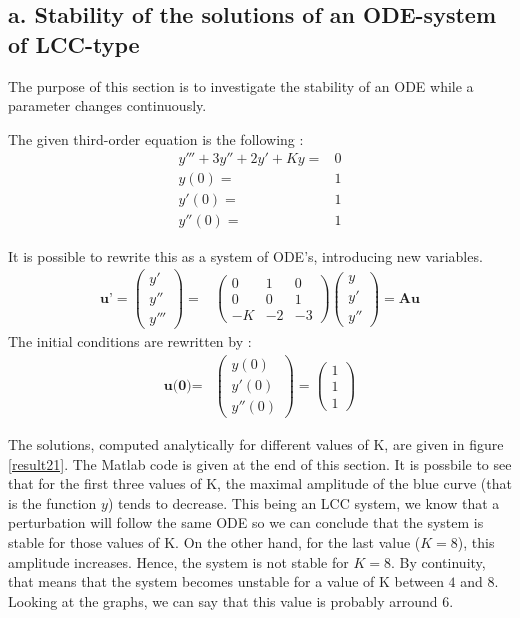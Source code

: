 \subsection*{a. Stability of the solutions of an ODE-system of LCC-type}
The purpose of this section is to investigate the stability of an ODE while a parameter changes continuously.

The given third-order equation is the following : 
\begin{eqnarray*}
y'''+3y''+2y'+Ky =& 0 \\
y(0) =& 1\\
y'(0)=&1\\
y''(0)=&1
\end{eqnarray*}

It is possible to rewrite this as a system of ODE's, introducing new variables.
\begin{eqnarray*}
\textbf{u'}  = \left( \begin{array}{c}
y' \\ 
y'' \\ 
y'''
\end{array} \right) =& \left( \begin{array}{ccc}
0 & 1 & 0 \\ 
0 & 0 & 1 \\ 
-K & -2 & -3
\end{array}  \right) \left( \begin{array}{c}
y \\ 
y'\\ 
y''
\end{array} \right) = \textbf{Au} 
\end{eqnarray*}
The initial conditions are rewritten by :
\begin{eqnarray*}
\textbf{u(0)} =& \left( \begin{array}{c}
y(0) \\ 
y'(0)\\ 
y''(0)
\end{array} \right) = \left( \begin{array}{c}
1\\ 
1\\ 
1
\end{array} \right) 
\end{eqnarray*}

The solutions, computed analytically for different values of K, are given in figure \ref{result21}. The Matlab code is given at the end of this section. It is possbile to see that for the first three values of K, the maximal amplitude of the blue curve (that is the function $y$) tends to decrease. This being an LCC system, we know that a perturbation will follow the same ODE so we can conclude that the system is stable for those values of K. On the other hand, for the last value ($K=8$), this amplitude increases. Hence, the system is not stable for $K=8$. By continuity, that means that the system becomes unstable for a value of K between $4$ and $8$. Looking at the graphs, we can say that this value is probably arround 6.

